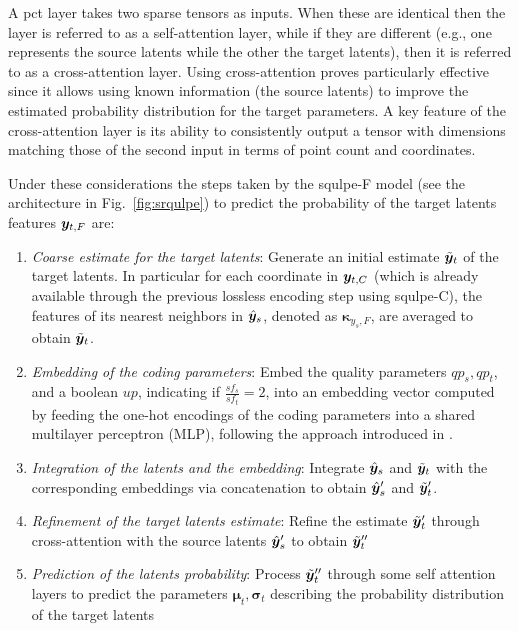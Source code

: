 A \gls{pct} layer takes two sparse tensors as inputs. When these are identical then the layer is referred to as a self-attention layer, while if they are different (e.g., one represents the source latents while the other the target latents), then it is referred to as a cross-attention layer. Using cross-attention proves particularly effective since it allows using known information (the source latents) to improve the estimated probability distribution for the target parameters. A key feature of the cross-attention layer is its ability to consistently output a tensor with dimensions matching those of the second input in terms of point count and coordinates.

Under these considerations the steps taken by the \gls{squlpe}-F model (see the architecture in Fig.~\ref{fig:srqulpe}) to predict the probability of the target latents features $\y_{t, F}$ are:
\begin{enumerate}
    \item \textit{Coarse estimate for the target latents}: Generate an initial estimate $\Tilde{\y}_{t}$ of the target latents. In particular for each coordinate in $\y_{t, C}$ (which is already available through the previous lossless encoding step using \gls{squlpe}-C), the features of its nearest neighbors in $\hat{\y}_{s}$, denoted as $\boldsymbol{\kappa}_{y_s, F}$, are averaged to obtain $\Tilde{\y}_{t}$.
    \item \textit{Embedding of the coding parameters}: Embed the quality parameters $qp_s, qp_t$, and a boolean $up$, indicating if $\frac{sf_s}{sf_t} = 2$, into an embedding vector computed by feeding the one-hot encodings of the coding parameters into a shared multilayer perceptron (MLP), following the approach introduced in \cite{mari2024point}.
    \item \textit{Integration of the latents and the embedding}: Integrate $\hat{\y}_s$ and $\Tilde{\y}_{t}$ with the corresponding embeddings via concatenation to obtain $\hat{\y}_s^\prime$ and $\Tilde{\y}_{t}^\prime$.
    \item \textit{Refinement of the target latents estimate}: Refine the estimate $\Tilde{\y}_{t}^\prime$ through cross-attention with the source latents $\hat{\y}_s^\prime$ to obtain $\Tilde{\y}_{t}^{\prime\prime}$ 
    \item \textit{Prediction of the latents probability}: Process $\Tilde{\y}_{t}^{\prime\prime}$ through some self attention layers to predict the parameters $\boldsymbol{\mu}_t, \boldsymbol{\sigma}_t$ describing the probability distribution of the target latents
\end{enumerate}

